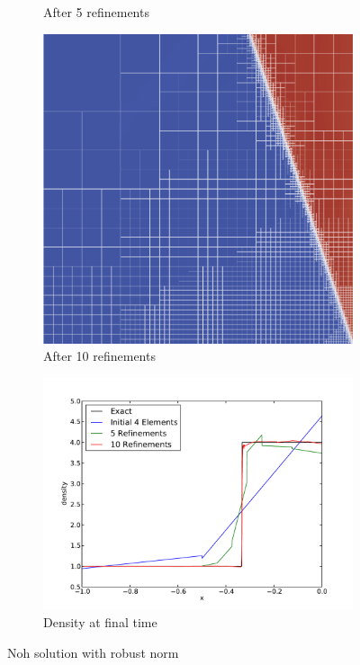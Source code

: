 \documentclass[Dissertation.tex]{subfiles}
\begin{document}
\begin{figure}[ht]
\begin{subfigure}[t]{0.32\textwidth}
\caption{After 5 refinements}
\end{subfigure}
\begin{subfigure}[t]{0.32\textwidth}
\centering
\includegraphics[width=\textwidth]{Dissertation/Noh/Robust-mesh10.png}
\caption{After 10 refinements}
\end{subfigure}
\begin{subfigure}[t]{0.9\textwidth}
\centering
\includegraphics[width=\textwidth]{Dissertation/Noh/Robust-den.pdf}
\caption{Density at final time}
\end{subfigure}
\caption{Noh solution with robust norm}
\label{fig:NohRobustMesh}
\end{figure}

\end{document}
